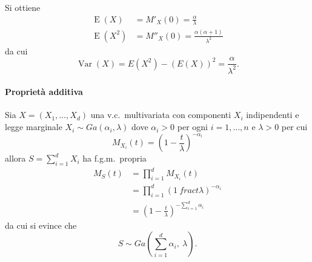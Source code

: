 \documentclass[11pt,a4paper,twoside]{article}
\newcommand\smallsum{\textstyle\sum}
\DeclareMathOperator{\Var}{Var}
\DeclareMathOperator{\E}{E}
\begin{document}
Si ottiene
\begin{align*}
  \E(X) &= M'_X(0) = \frac{\alpha}{\lambda} \\
  \E(X^2) &= M''_X(0) = \frac{\alpha (\alpha +1)}{\lambda^2}
\end{align*}
da cui
\[
  \Var(X) = E(X^2) - (E(X))^2 = \frac{\alpha}{\lambda^2}.
\]

\paragraph{Proprietà additiva}
Sia \(X = (X_1, \dots, X_d)\) una v.c.\ multivariata con componenti
\(X_i\) indipendenti e legge marginale \(X_i \sim Ga(\alpha_i,
\lambda)\) dove \(\alpha_i > 0\) per ogni \(i = 1, \dots, n\) e
\(\lambda > 0\) per cui
\[
  M_{X_i}(t) = \left( 1 - \frac{t}{\lambda} \right)^{-\alpha_i}
\]
allora \(S = \sum_{i=1}^d X_i\) ha f.g.m.\ propria
\begin{align*}
  M_S(t) &= \prod_{i=1}^d M_{X_i}(t) \\
         &= \prod_{i=1}^d \left( 1 \ frac{t}{\lambda} \right)^{-\alpha_i} \\
         &= \left( 1 - \frac{t}{\lambda} \right)^{- \sum_{i=1}^d \alpha_i}
\end{align*}
da cui si evince che
\[
  S \sim Ga\left( \smallsum_{i=1}^d \alpha_i, \: \lambda \right) .
\]
\end{document}
